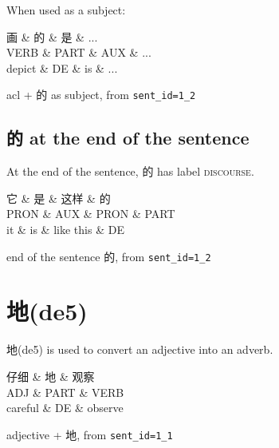 \documentclass[UTF8,oneside]{book}
\def\discourse{\textsc{discourse}}
\begin{document}
When used as a subject:

\begin{tree}[h]
\centering
\begin{dependency}[theme=simple]
\begin{deptext}[column sep=.5cm, row sep=.5ex]
画  \& 的  \& 是 \& ... \\
VERB \& PART \& AUX \& ... \\
depict \& DE \& is \& ... \\
\end{deptext}
\end{dependency}
\caption{acl + 的 as subject, from \texttt{sent\_id=1\_2}}
\end{tree}

\subsection{的 at the end of the sentence}

At the end of the sentence, 的 has label \discourse. 

\begin{tree}[h]
\centering
\begin{dependency}[theme=simple]
\begin{deptext}[column sep=.5cm, row sep=.5ex]
它  \& 是  \& 这样 \& 的 \\
PRON \& AUX \& PRON \& PART \\
it \& is \& like this \& DE \\
\end{deptext}
\end{dependency}
\caption{end of the sentence 的, from \texttt{sent\_id=1\_2}}
\end{tree}

\newpage
\section{地(de5)}

地(de5) is used to convert an adjective into an adverb. 

\begin{tree}[h]
\centering
\begin{dependency}[theme=simple]
\begin{deptext}[column sep=.5cm, row sep=.5ex]
仔细  \& 地  \& 观察 \\
ADJ \& PART \& VERB \\
careful \& DE \& observe \\
\end{deptext}
\end{dependency}
\caption{adjective + 地, from \texttt{sent\_id=1\_1}}
\end{tree}
\end{document}
